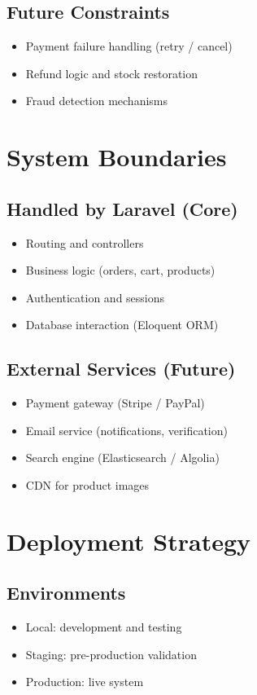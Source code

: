 \documentclass[12pt,a4paper]{article}
\begin{document}
\subsection{Future Constraints}
\begin{itemize}[noitemsep]
\item Payment failure handling (retry / cancel)
\item Refund logic and stock restoration
\item Fraud detection mechanisms
\end{itemize}

\section{System Boundaries}

\subsection{Handled by Laravel (Core)}
\begin{itemize}[noitemsep]
\item Routing and controllers
\item Business logic (orders, cart, products)
\item Authentication and sessions
\item Database interaction (Eloquent ORM)
\end{itemize}

\subsection{External Services (Future)}
\begin{itemize}[noitemsep]
\item Payment gateway (Stripe / PayPal)
\item Email service (notifications, verification)
\item Search engine (Elasticsearch / Algolia)
\item CDN for product images
\end{itemize}

\section{Deployment Strategy}

\subsection{Environments}
\begin{itemize}[noitemsep]
\item Local: development and testing
\item Staging: pre-production validation
\item Production: live system
\end{itemize}
\end{document}
